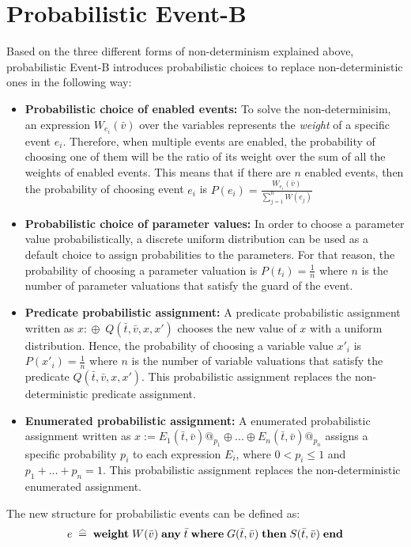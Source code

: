 \section{Probabilistic Event-B}
Based on the three different forms of non-determinism explained above, probabilistic Event-B \cite{Aouadhi2017} introduces probabilistic choices to replace non-deterministic ones in the following way:
\begin{itemize}
    \item \textbf{Probabilistic choice of enabled events:} To solve the non-determinisim, an expression $W_{e_i}(\bar{v})$ over the variables represents the \textit{weight} of a specific event $e_i$. Therefore, when multiple events are enabled, the probability of choosing one of them will be the ratio of its weight over the sum of all the weights of enabled events. This means that if there are $n$ enabled events, then the probability of choosing event $e_i$ is $P(e_i) = \frac{W_{e_i}(\bar{v})}{\sum^{n}_{j = 1}W(e_j)}$
    \item \textbf{Probabilistic choice of parameter values:} In order to choose a parameter value probabilistically, a discrete uniform distribution can be used as a default choice to assign probabilities to the parameters. For that reason, the probability of choosing a parameter valuation is $P(t_i) = \frac{1}{n}$ where $n$ is the number of parameter valuations that satisfy the guard of the event.
    \item \textbf{Predicate probabilistic assignment:} A predicate probabilistic assignment written as $x:\! \oplus \; Q(\bar{t}, \bar{v}, x, x')$ chooses the new value of $x$ with a uniform distribution. Hence, the probability of choosing a variable value $x'_i$ is $P(x'_i) = \frac{1}{n}$ where $n$ is the number of variable valuations that satisfy the predicate $Q(\bar{t}, \bar{v}, x, x')$. This probabilistic assignment replaces the non-deterministic predicate assignment. 
    \item \textbf{Enumerated probabilistic assignment:} A enumerated probabilistic assignment written as $x := E_1(\bar{t},\bar{v})@_{p_1}\oplus...\oplus E_n(\bar{t},\bar{v})@_{p_n}$  assigns a specific probability $p_i$ to each expression $E_i$, where $0 < p_i \leq 1$ and $p_1 + ... + p_n = 1$. This probabilistic assignment replaces the non-deterministic enumerated assignment.
\end{itemize}
The new structure for probabilistic events can be defined as:
\begin{align*}
    e \; \equalhat \; \textbf{weight} \; W( \bar{v}) \; \textbf{any} \; \bar{t} \; \textbf{where} \; G(\bar{t}, \bar{v}) \; \textbf{then} \; S(\bar{t}, \bar{v}) \; \textbf{end} 
\end{align*}
